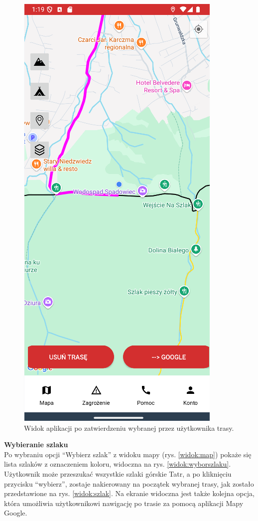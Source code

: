 \begin{figure}[H]
    \centering
    \includegraphics[scale=0.6]{img/imp/widok-trasa.png}
    \caption{Widok aplikacji po zatwierdzeniu wybranej przez użytkownika trasy.}
    \label{widok:zatwierdztrase}
\end{figure}

\noindent
\textbf{Wybieranie szlaku} \\
\indent Po wybraniu opcji “Wybierz szlak” z widoku mapy (rys. \ref{widok:map}) pokaże się lista szlaków z oznaczeniem koloru, widoczna na rys. \ref{widok:wyborszlaku}. Użytkownik może przeszukać wszystkie szlaki górskie Tatr, a po kliknięciu przycisku “wybierz”, zostaje nakierowany na początek wybranej trasy, jak zostało przedstawione na rys. \ref{widok:szlak}. Na ekranie widoczna jest także kolejna opcja, która umożliwia użytkownikowi nawigację po trasie za pomocą aplikacji Mapy Google.\\

